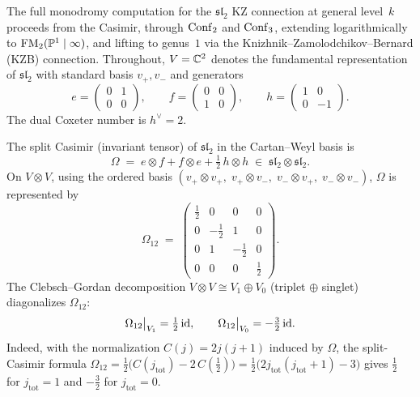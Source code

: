 The full monodromy computation for the $\mathfrak{sl}_2$ KZ connection
at general level~$k$ proceeds from the Casimir, through
$\mathrm{Conf}_2$ and $\mathrm{Conf}_3$, extending logarithmically to $\mathrm{FM}_2(\mathbb P^1\mid\infty)$,
and lifting to genus~$1$ via the Knizhnik--Zamolodchikov--Bernard (KZB) connection.
Throughout, $V=\mathbb C^2$ denotes the fundamental representation of $\mathfrak{sl}_2$
with standard basis $v_+,v_-$ and generators
\[
 e=\begin{pmatrix}0&1\\0&0\end{pmatrix},\qquad
 f=\begin{pmatrix}0&0\\1&0\end{pmatrix},\qquad
 h=\begin{pmatrix}1&0\\0&-1\end{pmatrix}.
\]
The dual Coxeter number is $h^\vee=2$.

\begin{computation}
\label{comp:sl2-casimir-spectrum}
The split Casimir (invariant tensor) of $\mathfrak{sl}_2$ in the
Cartan--Weyl basis is
\[
 \Omega \;=\; e\otimes f + f\otimes e + \tfrac{1}{2}\,h\otimes h
 \;\in\; \mathfrak{sl}_2\otimes\mathfrak{sl}_2.
\]
On $V\otimes V$, using the ordered basis
$(v_+\!\otimes\!v_+,\;v_+\!\otimes\!v_-,\;v_-\!\otimes\!v_+,\;v_-\!\otimes\!v_-)$,
$\Omega$ is represented by
\[
 \Omega_{12} \;=\;
 \begin{pmatrix}
 \frac{1}{2} & 0 & 0 & 0 \\[3pt]
 0 & -\frac{1}{2} & 1 & 0 \\[3pt]
 0 & 1 & -\frac{1}{2} & 0 \\[3pt]
 0 & 0 & 0 & \frac{1}{2}
 \end{pmatrix}.
\]
The Clebsch--Gordan decomposition $V\otimes V\cong V_1\oplus V_0$ (triplet $\oplus$ singlet)
diagonalizes $\Omega_{12}$:
\[
 \Omega_{12}\big|_{V_1}=\tfrac{1}{2}\,\mathrm{id},
 \qquad
 \Omega_{12}\big|_{V_0}=-\tfrac{3}{2}\,\mathrm{id}.
\]
Indeed, with the normalization $C(j)=2j(j+1)$ induced by $\Omega$, the split-Casimir formula $\Omega_{12}=\frac{1}{2}\bigl(C(j_{\mathrm{tot}})-2\,C(\tfrac{1}{2})\bigr)=\frac{1}{2}\bigl(2j_{\mathrm{tot}}(j_{\mathrm{tot}}+1)-3\bigr)$
gives $\frac{1}{2}$ for $j_{\mathrm{tot}}=1$ and $-\frac{3}{2}$ for $j_{\mathrm{tot}}=0$.
\end{computation}

